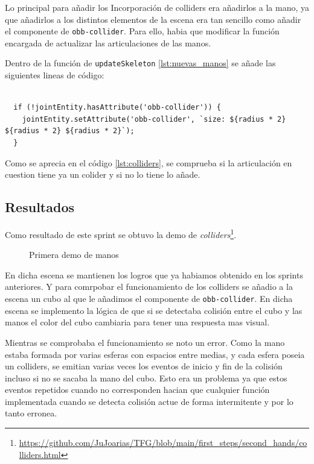 \documentclass[a4paper, 12pt]{book}
\begin{document}
Lo principal para añadir los Incorporación de colliders  
era añadirlos a la mano, ya que añadirlos a los distintos elementos de la escena era tan sencillo como añadir el componente de \texttt{obb-collider}. Para ello,
habia que modificar la función encargada de actualizar las articulaciones de las manos. 

Dentro de la función de \texttt{updateSkeleton} \ref{lst:nuevas_manos} se añade las siguientes lineas de código:

\begin{lstlisting}[caption=Añadir Incorporación de colliders a la mano, captionpos=b, label=lst:colliders]
  
  if (!jointEntity.hasAttribute('obb-collider')) {
    jointEntity.setAttribute('obb-collider', `size: ${radius * 2} ${radius * 2} ${radius * 2}`);
  }
\end{lstlisting}

Como se aprecia en el código \ref{lst:colliders}, se comprueba si la articulación en cuestion tiene ya un colider y si no lo tiene lo añade.

\subsection{Resultados}
\label{subsec:resultados4}
Como resultado de este sprint se obtuvo la demo de \textit{colliders}\footnote{\url{https://github.com/JuJoarias/TFG/blob/main/first_steps/second_hands/colliders.html}}. 

\begin{figure}[H] 
  \centering
  \fbox{\rule{0pt}{150pt} \rule{0.7\textwidth}{0pt}} 
  \caption{Primera demo de manos}
  \label{fig:sprint4}
\end{figure}

En dicha escena se mantienen los logros que ya habiamos obtenido en los sprints anteriores. Y para comrpobar el funcionamiento de los colliders se añadio a la escena un cubo
al que le añadimos el componente de \texttt{obb-collider}. En dicha escena se implemento la lógica de que si se detectaba colisión entre el cubo y las manos  el color del cubo cambiaria para tener una respuesta mas visual. 

Mientras se comprobaba el funcionamiento se noto un error. Como la mano estaba formada por varias esferas con espacios entre medias, y cada  esfera poseia un colliders, se emitian varias veces los eventos de inicio y fin de la colisión incluso si no se sacaba la mano del cubo. 
Esto era un problema ya que estos eventos repetidos cuando no corresponden hacian que cualquier función implementada cuando se detecta colisión actue de forma intermitente y por lo tanto erronea. 
\end{document}
